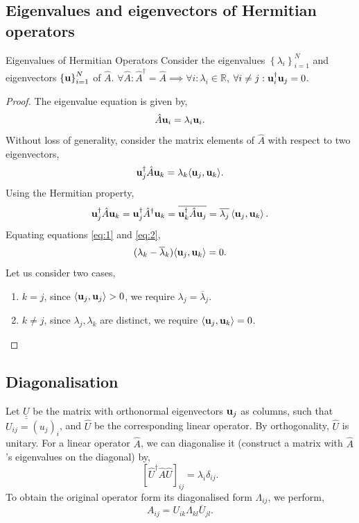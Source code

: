 \documentclass{book}
\def\innerproduct#1#2{\langle#1,#2\rangle}
\def\doubleunderline#1{\underline{\underline{#1}}}
\begin{document}
\subsection{Eigenvalues and eigenvectors of Hermitian operators}
\begin{Theorems}{Eigenvalues of Hermitian Operators}{}
	Consider the eigenvalues $\left\{\lambda_i\right\}_{i=1}^N$ and eigenvectors $\left\{\vb{u}\right\}_{i=1}^N$ of $\hat{A}$. $\forall \hat{A} : \hat{A}^{\dag} = \hat{A} \implies \forall i: \lambda_i \in \mathbb{R}$, $\forall i\neq j: \vb{u}_i^{\dag}\vb{u}_j = 0$.
\end{Theorems}
\begin{proof}
	The eigenvalue equation is given by,
	\begin{equation}
		\hat{A}\vb{u}_i = \lambda_i \vb{u}_i.
	\end{equation}
	Without loss of generality, consider the matrix elements of $\hat{A}$ with respect to two eigenvectors,
	\begin{equation}
		\vb{u}_j^{\dag}\hat{A}\vb{u}_k = \lambda_k\innerproduct{\vb{u}_j}{\vb{u}_k}. \label{eq:1}
	\end{equation}
	Using the Hermitian property,
	\begin{equation}
		\vb{u}_j^{\dag}\hat{A}\vb{u}_k = \vb{u}_j^{\dag}\hat{A}^{\dag}\vb{u}_k = \overline{\vb{u}_k^{\dag}\hat{A}\vb{u}_j} = \overline{\lambda_j}\left<\vb{u}_j, \vb{u}_k\right>. \label{eq:2}
	\end{equation}
	Equating equations \eqref{eq:1} and \eqref{eq:2},
	\begin{equation}
		(\lambda_k - \overline{\lambda}_k)\innerproduct{\vb{u}_j}{\vb{u}_k} = 0.
	\end{equation}
	Let us consider two cases,
	\begin{enumerate}
		\item $k = j$, since $\innerproduct{\vb{u}_j}{\vb{u}_j} > 0$, we require $\lambda_j = \overline{\lambda}_j$. 
		\item $k\neq j$, since $\lambda_j, \lambda_k$ are distinct, we require $\innerproduct{\vb{u}_j}{\vb{u}_k} = 0$. 
	\end{enumerate}
\end{proof}
\subsection{Diagonalisation}
Let $\doubleunderline{U}$ be the matrix with orthonormal eigenvectors $\vb{u}_j$ as columns, such that $U_{ij} = (u_j)_i$, and $\hat{U}$ be the corresponding linear operator. By orthogonality, $\hat{U}$ is unitary. For a linear operator $\hat{A}$, we can diagonalise it (construct a matrix with $\hat{A}$'s eigenvalues on the diagonal) by,
\begin{equation}
	\left[\hat{U}^{\dag}\hat{A}\hat{U}\right]_{ij} = \lambda_i\delta_{ij}.
\end{equation}
To obtain the original operator form its diagonalised form $\Lambda_{ij}$, we perform,
\begin{equation}
	A_{ij} = U_{ik}\Lambda_{kl}\overline{U}_{jl}.
\end{equation}
\end{document}

